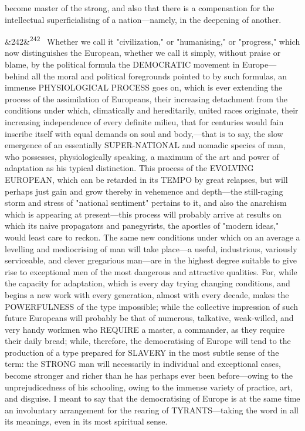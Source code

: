 \documentclass[12pt]{article}
\newcommand{\para}[1][]{\par\noindent\ifx&#1&\else\textsuperscript{\footnotesize #1}~\fi}
\begin{document}
become master of the strong, and also that there is a compensation for the intellectual superficialising of a nation---namely, in the deepening of another.

\para[242] Whether we call it "civilization," or "humanising," or "progress," which now distinguishes the European, whether we call it simply, without praise or blame, by the political formula the DEMOCRATIC movement in Europe---behind all the moral and political foregrounds pointed to by such formulas, an immense PHYSIOLOGICAL PROCESS goes on, which is ever extending the process of the assimilation of Europeans, their increasing detachment from the conditions under which, climatically and hereditarily, united races originate, their increasing independence of every definite milieu, that for centuries would fain inscribe itself with equal demands on soul and body,---that is to say, the slow emergence of an essentially SUPER-NATIONAL and nomadic species of man, who possesses, physiologically speaking, a maximum of the art and power of adaptation as his typical distinction. This process of the EVOLVING EUROPEAN, which can be retarded in its TEMPO by great relapses, but will perhaps just gain and grow thereby in vehemence and depth---the still-raging storm and stress of "national sentiment" pertains to it, and also the anarchism which is appearing at present---this process will probably arrive at results on which its naive propagators and panegyrists, the apostles of "modern ideas," would least care to reckon. The same new conditions under which on an average a levelling and mediocrising of man will take place---a useful, industrious, variously serviceable, and clever gregarious man---are in the highest degree suitable to give rise to exceptional men of the most dangerous and attractive qualities. For, while the capacity for adaptation, which is every day trying changing conditions, and begins a new work with every generation, almost with every decade, makes the POWERFULNESS of the type impossible; while the collective impression of such future Europeans will probably be that of numerous, talkative, weak-willed, and very handy workmen who REQUIRE a master, a commander, as they require their daily bread; while, therefore, the democratising of Europe will tend to the production of a type prepared for SLAVERY in the most subtle sense of the term: the STRONG man will necessarily in individual and exceptional cases, become stronger and richer than he has perhaps ever been before---owing to the unprejudicedness of his schooling, owing to the immense variety of practice, art, and disguise. I meant to say that the democratising of Europe is at the same time an involuntary arrangement for the rearing of TYRANTS---taking the word in all its meanings, even in its most spiritual sense.
\end{document}
